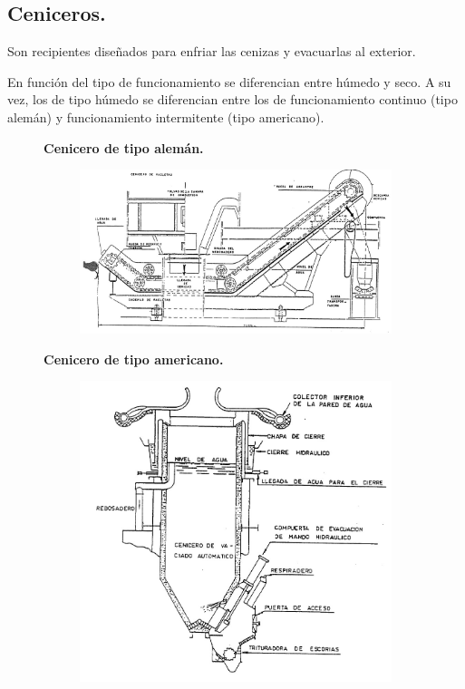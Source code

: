 \subsection{Ceniceros.}
Son recipientes diseñados para enfriar las cenizas y evacuarlas al exterior.




En función del tipo de funcionamiento se diferencian entre húmedo y seco. A su vez, los de tipo húmedo se diferencian entre los de funcionamiento continuo (tipo alemán) y funcionamiento intermitente (tipo americano).
\begin{figure}[H]
	\begin{minipage}{0.55\textwidth}
		\centering
		\textbf{Cenicero de tipo alemán.}
		\begin{figure}[H]
			\centering
			\includegraphics[width=1\linewidth]{res/tema10/aleman}
			\label{fig:aleman}
		\end{figure}
	\end{minipage}
	\begin{minipage}{0.45\textwidth}
		\centering
		\textbf{Cenicero de tipo americano.}
		\begin{figure}[H]
			\centering
			\includegraphics[width=0.7\linewidth]{res/tema10/americano}
			\label{fig:americano}
		\end{figure}
	\end{minipage}
\end{figure}	





